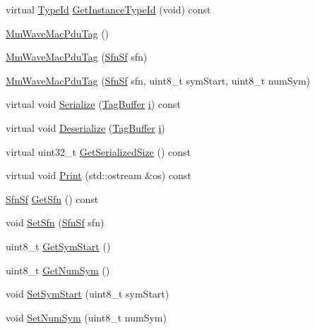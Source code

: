 \begin{DoxyCompactItemize}
\item 
virtual \hyperlink{classns3_1_1TypeId}{Type\+Id} \hyperlink{classns3_1_1MmWaveMacPduTag_a568c46ed3c31915f2a2ee2bde7c81cab}{Get\+Instance\+Type\+Id} (void) const 
\item 
\hyperlink{classns3_1_1MmWaveMacPduTag_adec9a88c1c3616462d2839f857ac336d}{Mm\+Wave\+Mac\+Pdu\+Tag} ()
\item 
\hyperlink{classns3_1_1MmWaveMacPduTag_a13948c490b0172c095cf6f91653b886e}{Mm\+Wave\+Mac\+Pdu\+Tag} (\hyperlink{structns3_1_1SfnSf}{Sfn\+Sf} sfn)
\item 
\hyperlink{classns3_1_1MmWaveMacPduTag_afb5722d3dadf9b150dde8dd89b8a4f6f}{Mm\+Wave\+Mac\+Pdu\+Tag} (\hyperlink{structns3_1_1SfnSf}{Sfn\+Sf} sfn, uint8\+\_\+t sym\+Start, uint8\+\_\+t num\+Sym)
\item 
virtual void \hyperlink{classns3_1_1MmWaveMacPduTag_aa1af1dad4141d8d0485a54908f989871}{Serialize} (\hyperlink{classns3_1_1TagBuffer}{Tag\+Buffer} \hyperlink{lte__uplink__power__control_8m_a6f6ccfcf58b31cb6412107d9d5281426}{i}) const 
\item 
virtual void \hyperlink{classns3_1_1MmWaveMacPduTag_a51071b86fa49d7b8b1cc80016f5c5a95}{Deserialize} (\hyperlink{classns3_1_1TagBuffer}{Tag\+Buffer} \hyperlink{lte__uplink__power__control_8m_a6f6ccfcf58b31cb6412107d9d5281426}{i})
\item 
virtual uint32\+\_\+t \hyperlink{classns3_1_1MmWaveMacPduTag_a70da1980a53ba958051ac3991e5e2d6b}{Get\+Serialized\+Size} () const 
\item 
virtual void \hyperlink{classns3_1_1MmWaveMacPduTag_ab7deefbe7330a2a2e93fa40f35ef5f01}{Print} (std\+::ostream \&os) const 
\item 
\hyperlink{structns3_1_1SfnSf}{Sfn\+Sf} \hyperlink{classns3_1_1MmWaveMacPduTag_ae8bc809418bc961549fd783c137e0fed}{Get\+Sfn} () const 
\item 
void \hyperlink{classns3_1_1MmWaveMacPduTag_ae2fa3725902d41bc90b16321729d876f}{Set\+Sfn} (\hyperlink{structns3_1_1SfnSf}{Sfn\+Sf} sfn)
\item 
uint8\+\_\+t \hyperlink{classns3_1_1MmWaveMacPduTag_ac1fb1fd960930705fad018a66116b344}{Get\+Sym\+Start} ()
\item 
uint8\+\_\+t \hyperlink{classns3_1_1MmWaveMacPduTag_a791faf394f6e69aaeb6639f38428199a}{Get\+Num\+Sym} ()
\item 
void \hyperlink{classns3_1_1MmWaveMacPduTag_a497118508ac1802edf988150bc93673d}{Set\+Sym\+Start} (uint8\+\_\+t sym\+Start)
\item 
void \hyperlink{classns3_1_1MmWaveMacPduTag_adb486514b35834adf7f13f90c24de4e9}{Set\+Num\+Sym} (uint8\+\_\+t num\+Sym)
\end{DoxyCompactItemize}
